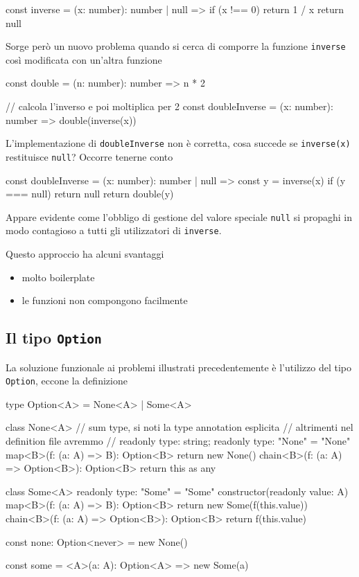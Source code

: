 \documentclass[12pt]{article}
\theoremstyle{definition}
\newenvironment{code}
  {\vspace{0.5cm} \VerbatimEnvironment\begin{typescriptcode}}
  {\end{typescriptcode} \vspace{0.2cm}}
\begin{document}
\begin{code}
const inverse = (x: number): number | null => {
  if (x !== 0) return 1 / x
  return null
}
\end{code}

Sorge però un nuovo problema quando si cerca di comporre la funzione \texttt{inverse} così modificata con un'altra funzione

\begin{code}
const double = (n: number): number => n * 2

// calcola l'inverso e poi moltiplica per 2
const doubleInverse = (x: number): number => double(inverse(x))
\end{code}

L'implementazione di \texttt{doubleInverse} non è corretta, cosa succede se \texttt{inverse(x)} restituisce \texttt{null}?
Occorre tenerne conto

\begin{code}
const doubleInverse = (x: number): number | null => {
  const y = inverse(x)
  if (y === null) return null
  return double(y)
}
\end{code}

Appare evidente come l'obbligo di gestione del valore speciale \texttt{null} si propaghi in modo contagioso
a tutti gli utilizzatori di \texttt{inverse}.

Questo approccio ha alcuni svantaggi

\begin{itemize}
  \item molto boilerplate
  \item le funzioni non compongono facilmente
\end{itemize}

\subsection{Il tipo \texttt{Option}}

La soluzione funzionale ai problemi illustrati precedentemente è l'utilizzo del tipo \texttt{Option},
eccone la definizione

\begin{code}
type Option<A> = None<A> | Some<A>

class None<A> {
  // sum type, si noti la type annotation esplicita
  // altrimenti nel definition file avremmo
  // readonly type: string;
  readonly type: "None" = "None"
  map<B>(f: (a: A) => B): Option<B> {
    return new None()
  }
  chain<B>(f: (a: A) => Option<B>): Option<B> {
    return this as any
  }
}

class Some<A> {
  readonly type: "Some" = "Some"
  constructor(readonly value: A) {}
  map<B>(f: (a: A) => B): Option<B> {
    return new Some(f(this.value))
  }
  chain<B>(f: (a: A) => Option<B>): Option<B> {
    return f(this.value)
  }
}

const none: Option<never> = new None()

const some = <A>(a: A): Option<A> => new Some(a)
\end{code}
\end{document}
